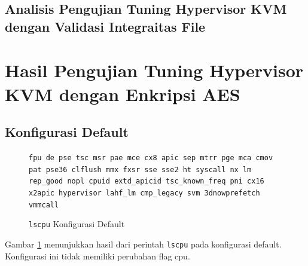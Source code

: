 \subsection{Analisis Pengujian Tuning Hypervisor KVM dengan Validasi Integraitas File}

\section{Hasil Pengujian Tuning Hypervisor KVM dengan Enkripsi AES}

\subsection{Konfigurasi Default}
\begin{figure}
    \texttt{fpu de pse tsc msr pae mce cx8 apic sep mtrr pge mca cmov pat pse36 clflush mmx fxsr sse sse2 ht syscall nx lm rep\_good nopl cpuid extd\_apicid tsc\_known\_freq pni cx16 x2apic hypervisor lahf\_lm cmp\_legacy svm 3dnowprefetch vmmcall}
    \caption{\texttt{lscpu} Konfigurasi Default}
    \label{fig:lscpu_aes_test_default}
\end{figure}

Gambar \ref{fig:lscpu_aes_test_default} menunjukkan hasil dari perintah \texttt{lscpu} pada konfigurasi default. Konfigurasi ini tidak memiliki perubahan flag cpu.

